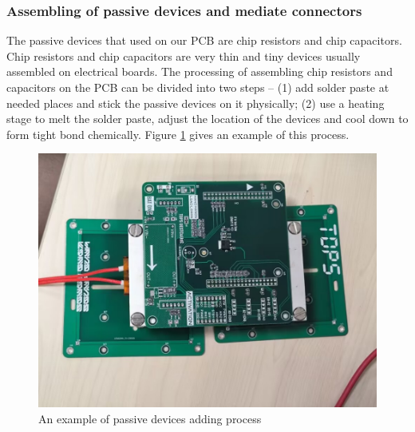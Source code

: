 \documentclass[12pt, a4paper, oneside]{report}
\begin{document}
\subsubsection{Assembling of passive devices and mediate connectors}
The passive devices that used on our PCB are chip resistors and chip capacitors. Chip resistors and chip capacitors are very thin and tiny devices usually assembled on electrical boards. The processing of assembling chip resistors and capacitors on the PCB can be divided into two steps – (1) add solder paste at needed places and stick the passive devices on it physically; (2) use a heating stage to melt the solder paste, adjust the location of the devices and cool down to form tight bond chemically. Figure \ref{fig:pcb14} gives an example of this process. 
\begin{figure}[!h]
	\centering
	\includegraphics[scale=0.25]{pic/PCB_figure/14_PCB.jpg}
	\caption{An example of passive devices adding process}
    \label{fig:pcb14}
\end{figure}
\end{document}
